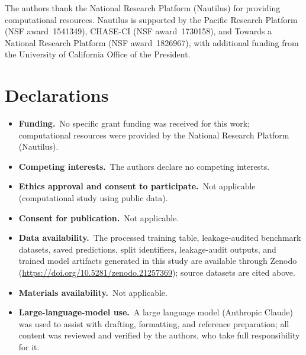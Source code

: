 \documentclass[sn-nature]{sn-jnl}%
\begin{document}
The authors thank the National Research Platform (Nautilus) for providing computational
resources. Nautilus is supported by the Pacific Research Platform (NSF award~1541349),
CHASE-CI (NSF award~1730158), and Towards a National Research Platform (NSF award~1826967),
with additional funding from the University of California Office of the President.

\section*{Declarations}
\begin{itemize}
  \item \textbf{Funding.}\ No specific grant funding was received for this work; computational
        resources were provided by the National Research Platform (Nautilus).
  \item \textbf{Competing interests.}\ The authors declare no competing interests.
  \item \textbf{Ethics approval and consent to participate.}\ Not applicable (computational study using public data).
  \item \textbf{Consent for publication.}\ Not applicable.
  \item \textbf{Data availability.}\ The processed training table, leakage-audited benchmark
        datasets, saved predictions, split identifiers, leakage-audit outputs, and trained
        model artifacts generated in this study are available through Zenodo
        (\url{https://doi.org/10.5281/zenodo.21257369}); source datasets are cited above.
  \item \textbf{Materials availability.}\ Not applicable.
  \item \textbf{Large-language-model use.}\ A large language model (Anthropic Claude) was used
        to assist with drafting, formatting, and reference preparation; all content was
        reviewed and verified by the authors, who take full responsibility for it.

\end{itemize}
\end{document}
